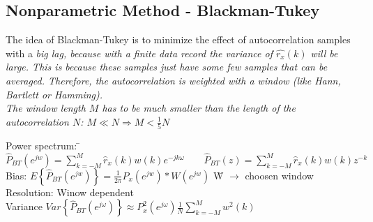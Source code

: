 \subsection{Nonparametric Method - Blackman-Tukey }
The idea of Blackman-Tukey is to minimize the effect of autocorrelation samples with a \em big lag\em, because with a finite data record the variance of $\hat{r_x}(k)$ will be large.
This is because these samples just have some few samples that can be averaged.
Therefore, the autocorrelation is weighted with a window (like Hann, Bartlett or Hamming).\\
The window length $M$ has to be much smaller than the length of the autocorrelation $N$: $M  \ll N \Rightarrow M < \frac{1}{5}N$
\begin{tabbing}
Power spectrum:  	\=  $\hat{P}_{BT}(e^{jw}) =  \sum\limits_{k=-M}^{M} \hat{r}_x(k)w(k)e^{-jk\omega} \qquad
						\hat{P}_{BT}(z) =  \sum\limits_{k=-M}^{M} \hat{r}_x(k)w(k)z^{-k}$   \\
Bias: 				\>  $E\left\lbrace \hat{P}_{BT}(e^{jw}) \right\rbrace = \frac{1}{2 \pi}P_x(e^{jw})*W(e^{jw})$  \hspace{2cm} \= W $\to$ choosen window\\
Resolution: 		\>  Winow dependent\\
Variance 			\> $Var\left\lbrace\hat{P}_{BT}(e^{j\omega})\right\rbrace \approx P^2_x(e^{j\omega}) \frac{1}{N} \sum\limits_{k=-M}^{M}w^2(k)$\\
\end{tabbing}

